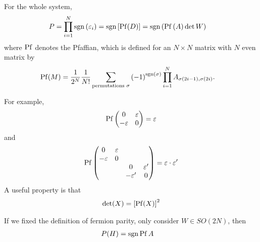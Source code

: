 For the whole system,
\begin{align}
    P &=
    \prod_{i=1}^{N} \operatorname{sgn}\left( \varepsilon_i \right)
    =
    \operatorname{sgn}\left[ \operatorname{Pf}(D) \right]
    = \operatorname{sgn}\left( \operatorname{Pf}\left( A \right) \det W \right)
\end{align}
where $\operatorname{Pf}$ denotes the Pfaffian,
which is defined for an $N\times N$ matrix with $N$ even matrix by
\begin{align}
    \operatorname{Pf}(M) &=
    \frac{1}{2^{N}}
    \frac{1}{N!}
    \sum_{\text{permutations }\sigma}
    {(-1)}^{\operatorname{sgn}(\sigma)}
    \prod_{i=1}^{N}
    A_{\sigma(2 i - 1), \sigma(2i)}.
\end{align}

For example,
\begin{align}
    \operatorname{Pf}
    \begin{pmatrix}
        0 & \varepsilon\\
        -\varepsilon & 0
    \end{pmatrix}
    = \varepsilon
\end{align}
and
\begin{align}
    \operatorname{Pf}
    \begin{pmatrix}
        0 & \varepsilon & &\\
        -\varepsilon & 0 & &\\
        & & 0 & \varepsilon'\\
        & & -\varepsilon' & 0
    \end{pmatrix}
    = \varepsilon\cdot \varepsilon'
\end{align}
A useful property is that
\begin{align}
    \det(X) = {\left[ \operatorname{Pf}(X) \right]}^2
\end{align}

If we fixed the definition of fermion parity,
only consider $W\in SO(2N)$,
then
\begin{align}
    P(H) &= \operatorname{sgn} \operatorname{Pf} A
\end{align}

